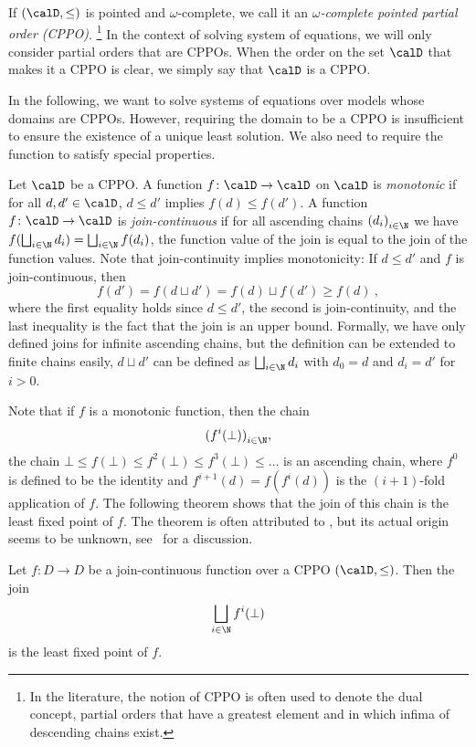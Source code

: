 \documentclass[../../diss.tex]{subfiles}
\begin{document}
If $(\domain, \leq)$ is pointed and $\omega$-complete, we call it an \emph{$\omega$-complete pointed partial order (CPPO)}.%
\footnote{In the literature, the notion of CPPO is often used to denote the dual concept, \ie partial orders that have a greatest element and in which infima of descending chains exist.}
In the context of solving system of equations, we will only consider partial orders that are CPPOs.
When the order on the set $\domain$ that makes it a CPPO is clear, we simply say that $\domain$ is a CPPO.\@

In the following, we want to solve systems of equations over models whose domains are CPPOs.
However, requiring the domain to be a CPPO is insufficient to ensure the existence of a unique least solution.
We also need to require the function to satisfy special properties.

Let $\domain$ be a CPPO.\@
A function $f \colon \domain \to \domain$ on $\domain$ is \emph{monotonic} if for all $d, d' \in \domain$, $d \leq d'$ implies $f(d) \leq f(d')$.
A function $f \colon \domain \to \domain$ is \emph{join-continuous} if for all ascending chains ${(d_i)}_{i \in \N}$ we have $f(\bigsqcup_{i \in \N} d_i) = \bigsqcup_{i \in \N} f(d_i)$, \ie the function value of the join is equal to the join of the function values.
Note that join-continuity implies monotonicity: If $d \leq d'$ and $f$ is join-continuous, then
\[
    f(d') = f (d \sqcup d') = f(d) \sqcup f(d') \geq f(d)
    \ ,
\]
where the first equality holds since $d \leq d'$, the second is join-continuity, and the last inequality is the fact that the join is an upper bound.
Formally, we have only defined joins for infinite ascending chains, but the definition can be extended to finite chains easily, \eg $d \sqcup d'$ can be defined as $\bigsqcup_{i \in \N} d_i$ with $d_0 = d$ and $d_i = d'$ for $i > 0$.

Note that if $f$ is a monotonic function, then the chain
\[
    {(f^i(\bot))}_{i \in \N}
    ,
\]
\ie the chain
$
    \bot \leq f(\bot) \leq f^2 (\bot) \leq f^3 (\bot) \leq \ldots
$
is an ascending chain, where $f^0$ is defined to be the identity and $f^{i+1}(d) = f(f^{i}(d))$ is the $(i+1)$-fold application of $f$.
The following theorem shows that the join of this chain is the least fixed point of $f$.
The theorem is often attributed to , but its actual origin seems to be unknown, see~\cite{LassezNS82} for a discussion.

\begin{ntheorem}%
\label{Theorem:EDSKleene}%
    Let $f \colon D \to D$ be a join-continuous function over a CPPO $(\domain,\leq)$.
    Then the join
    \[
        \bigsqcup_{i \in \N} f^i (\bot)
    \]
    is the least fixed point of $f$.
\end{ntheorem}
\end{document}
